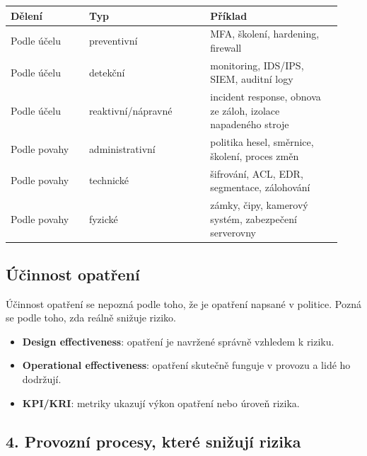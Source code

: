 \begin{longtable}{p{0.22\linewidth}p{0.34\linewidth}p{0.37\linewidth}}
\toprule
\textbf{Dělení} & \textbf{Typ} & \textbf{Příklad} \\
\midrule\endhead
Podle účelu & preventivní & MFA, školení, hardening, firewall \\
Podle účelu & detekční & monitoring, IDS/IPS, SIEM, auditní logy \\
Podle účelu & reaktivní/nápravné & incident response, obnova ze záloh, izolace napadeného stroje \\
\addlinespace
Podle povahy & administrativní & politika hesel, směrnice, školení, proces změn \\
Podle povahy & technické & šifrování, ACL, EDR, segmentace, zálohování \\
Podle povahy & fyzické & zámky, čipy, kamerový systém, zabezpečení serverovny \\
\bottomrule
\end{longtable}

\subsection*{Účinnost opatření}

Účinnost opatření se nepozná podle toho, že je opatření napsané v politice. Pozná se podle toho, zda reálně snižuje riziko.

\begin{itemize}
    \item \textbf{Design effectiveness}: opatření je navržené správně vzhledem k riziku.
    \item \textbf{Operational effectiveness}: opatření skutečně funguje v provozu a lidé ho dodržují.
    \item \textbf{KPI/KRI}: metriky ukazují výkon opatření nebo úroveň rizika.
\end{itemize}


\subsection*{4. Provozní procesy, které snižují rizika}


